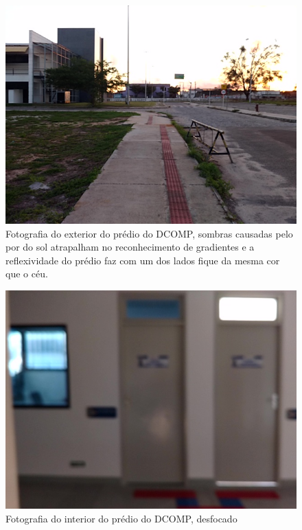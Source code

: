 \begin{figure}[!htb]
	\centering
		\includegraphics[width= \textwidth]{Imagens/figura4-16.jpg}
	\caption{Fotografia do exterior do prédio do DCOMP, sombras causadas pelo por do sol atrapalham no reconhecimento de gradientes e a reflexividade do prédio faz com um dos lados fique da mesma cor que o céu.}
	\label{fig4:16}
\end{figure}

\begin{figure}[!htb]
	\centering
		\includegraphics[width= \textwidth]{Imagens/figura4-17.jpg}
	\caption{Fotografia do interior do prédio do DCOMP, desfocado}
	\label{fig4:17}
\end{figure}


